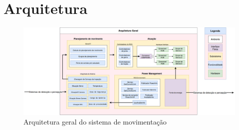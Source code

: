 
\chapter{Arquitetura}
\label{Append:arquitetura}


\begin{figure}[H]
	\centering
	\includegraphics[scale=0.32, angle=270]{Figures/ArquiteturaPORTUGUES.png}
	\caption{Arquitetura geral do sistema de movimentação}
	\label{fig:arq_geral}
\end{figure}
